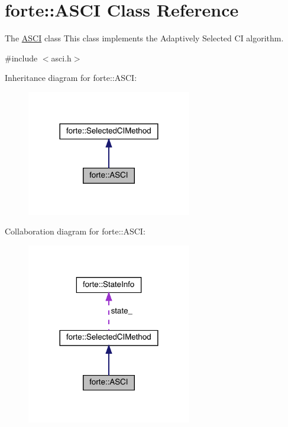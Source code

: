 \hypertarget{classforte_1_1_a_s_c_i}{}\section{forte\+:\+:A\+S\+CI Class Reference}
\label{classforte_1_1_a_s_c_i}


The \mbox{\hyperlink{classforte_1_1_a_s_c_i}{A\+S\+CI}} class This class implements the Adaptively Selected CI algorithm.  




{\ttfamily \#include $<$asci.\+h$>$}



Inheritance diagram for forte\+:\+:A\+S\+CI\+:
\nopagebreak
\begin{figure}[H]
\begin{center}
\leavevmode
\includegraphics[width=204pt]{classforte_1_1_a_s_c_i__inherit__graph}
\end{center}
\end{figure}


Collaboration diagram for forte\+:\+:A\+S\+CI\+:
\nopagebreak
\begin{figure}[H]
\begin{center}
\leavevmode
\includegraphics[width=204pt]{classforte_1_1_a_s_c_i__coll__graph}
\end{center}
\end{figure}
